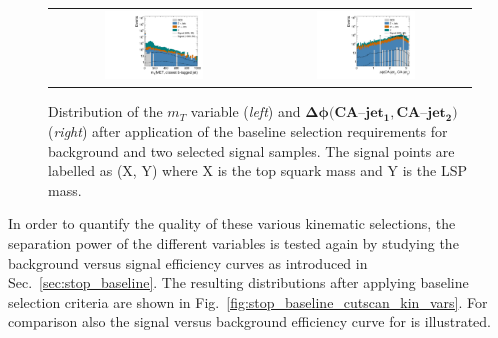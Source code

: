 \begin{figure}[!t]
  \centering
  \begin{tabular}{cc}
                \includegraphics[width=0.49\textwidth]{figures/Stop_DeltaPhiSelection_transverseMass_MET_closestAndBTaggedJet.pdf} &
                \includegraphics[width=0.49\textwidth]{figures/Stop_DeltaPhiSelection_deltaPhi_topjet1_topjet2.pdf}
  \end{tabular}
  \caption{Distribution of the $m_T$ variable (\textit{left}) and $\mathbf{\Delta \phi(CA}$--$\mathbf{jet_1, CA}$--$\mathbf{jet_2)}$ (\textit{right}) after application of the baseline selection requirements for background and two selected signal samples. The signal points are labelled as (X, Y) where X is the top squark mass and Y is the LSP mass.}
  \label{fig:stop_baseline_kin_vars2}
\end{figure}
In order to quantify the quality of these various kinematic selections, the separation power of the different variables is tested again by studying the background versus signal efficiency curves as introduced in Sec.~\ref{sec:stop_baseline}. The resulting distributions after applying baseline selection criteria are shown in Fig.~\ref{fig:stop_baseline_cutscan_kin_vars}. For comparison also the signal versus background efficiency curve for \met is illustrated. \\

